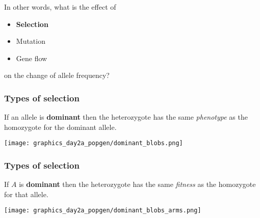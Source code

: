 \documentclass{beamer}
\newcommand{\1}{\ensuremath{\mathbf{1}}}
\begin{document}
%
%
%
\begin{frame}
	In other words, what is the effect of
	\begin{itemize}
		\item \textbf{Selection}
		\item Mutation
		\item Gene flow
	\end{itemize}
	on the change of allele frequency?
\end{frame}
%
%
%
\begin{frame}\frametitle{Types of selection}
	If an allele is \textbf{dominant} then the heterozygote has the same \emph{phenotype} as the homozygote for the dominant allele.
	\begin{center}
		\texttt{[image: graphics\_day2a\_popgen/dominant\_blobs.png]}
	\end{center}
\end{frame}
%
%
%
\begin{frame}\frametitle{Types of selection}
	If $A$ is \textbf{dominant} then the heterozygote has the same \emph{fitness} as the homozygote for that allele.
	\begin{center}
		\texttt{[image: graphics\_day2a\_popgen/dominant\_blobs\_arms.png]}
	\end{center}
\end{frame}
\end{document}
